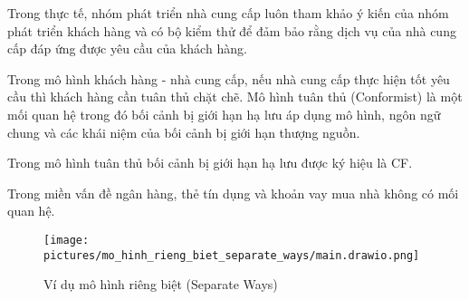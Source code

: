 Trong thực tế, nhóm phát triển nhà cung cấp luôn tham khảo ý kiến của nhóm phát triển khách hàng và có bộ kiểm thử để đảm bảo rằng dịch vụ của nhà cung cấp đáp ứng được yêu cầu của khách hàng.


Trong mô hình khách hàng - nhà cung cấp, nếu nhà cung cấp thực hiện tốt yêu cầu thì khách hàng cần tuân thủ chặt chẽ. Mô hình tuân thủ (Conformist) là một mối quan hệ trong đó bối cảnh bị giới hạn hạ lưu áp dụng mô hình, ngôn ngữ chung và các khái niệm của bối cảnh bị giới hạn thượng nguồn.

Trong mô hình tuân thủ bối cảnh bị giới hạn hạ lưu được ký hiệu là CF.






















\begin{example} Trong miền vấn đề ngân hàng, thẻ tín dụng và khoản vay mua nhà không có mối quan hệ.

\begin{figure}[H]

\centering

\texttt{[image: pictures/mo\_hinh\_rieng\_biet\_separate\_ways/main.drawio.png]}

\caption{Ví dụ mô hình riêng biệt (Separate Ways)}

\end{figure}

\end{example}

